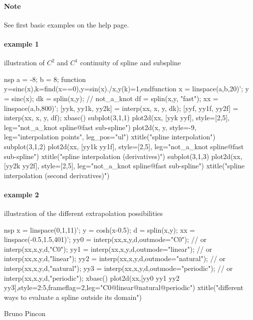   \begin{examples}

\paragraph{Note} See first basic examples on the   help page.

\paragraph{example 1}  illustration of $C^2$ and $C^1$ continuity of spline and subspline
\begin{mintednsp}{nsp}
a = -8; b = 8;
function y=sinc(x),k=find(x==0),y=sin(x)./x,y(k)=1,endfunction
x = linspace(a,b,20)';
y = sinc(x);
dk = splin(x,y);  // not_a_knot
df = splin(x,y, "fast");
xx = linspace(a,b,800)';
[yyk, yy1k, yy2k] = interp(xx, x, y, dk); 
[yyf, yy1f, yy2f] = interp(xx, x, y, df); 
xbasc()
subplot(3,1,1)
plot2d(xx, [yyk yyf], style=[2,5], leg="not_a_knot spline@fast sub-spline")
plot2d(x, y, style=-9, leg="interpolation points", leg_pos="ul")
xtitle("spline interpolation")
subplot(3,1,2)
plot2d(xx, [yy1k yy1f], style=[2,5], leg="not_a_knot spline@fast sub-spline")
xtitle("spline interpolation (derivatives)")
subplot(3,1,3)
plot2d(xx, [yy2k yy2f], style=[2,5], leg="not_a_knot spline@fast sub-spline")
xtitle("spline interpolation (second derivatives)")
\end{mintednsp}

\paragraph{example 2} illustration of the different extrapolation possibilities
\begin{mintednsp}{nsp}
x = linspace(0,1,11)';
y = cosh(x-0.5);
d = splin(x,y);
xx = linspace(-0.5,1.5,401)';
yy0 = interp(xx,x,y,d,outmode="C0"); // or  interp(xx,x,y,d,"C0");
yy1 = interp(xx,x,y,d,outmode="linear"); // or interp(xx,x,y,d,"linear");
yy2 = interp(xx,x,y,d,outmode="natural"); // or interp(xx,x,y,d,"natural");
yy3 = interp(xx,x,y,d,outmode="periodic"); // or interp(xx,x,y,d,"periodic");
xbasc()
plot2d(xx,[yy0 yy1 yy2 yy3],style=2:5,frameflag=2,leg="C0@linear@natural@periodic")
xtitle("different ways to evaluate a spline outside its domain")
\end{mintednsp}

\end{examples}

\begin{manseealso}
\end{manseealso}

\begin{authors}
    Bruno Pincon
\end{authors}

